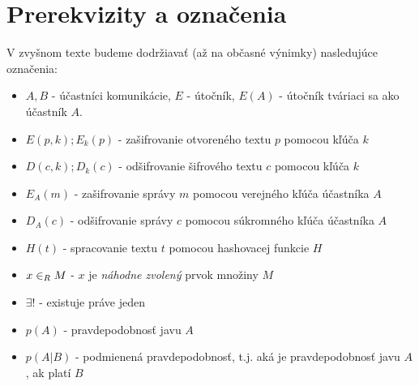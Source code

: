 \section{Prerekvizity a označenia}


V zvyšnom texte budeme dodržiavať (až na občasné výnimky) nasledujúce
označenia:
\begin{itemize}
\item $A,B$ - účastníci komunikácie, $E$ - útočník, $E(A)$ - útočník
            tváriaci sa ako účastník $A$.
\item $E(p,k); E_k(p)$ - zašifrovanie otvoreného textu $p$ pomocou kľúča $k$
\item $D(c,k); D_k(c)$ - odšifrovanie šifrového textu $c$ pomocou kľúča $k$
\item $E_A(m)$ - zašifrovanie správy $m$ pomocou verejného kľúča účastníka $A$
\item $D_A(c)$ - odšifrovanie správy $c$ pomocou súkromného kľúča účastníka $A$
\item $H(t)$ - spracovanie textu $t$ pomocou hashovacej funkcie $H$
\item $x \in_{R} M$ - $x$ je \emph{náhodne zvolený} prvok množiny $M$
\item $\exists !$ - existuje práve jeden
\item $p(A)$ - pravdepodobnosť javu $A$
\item $p(A|B)$ - podmienená pravdepodobnosť, t.j. aká je pravdepodobnosť javu $A$, ak platí $B$
\end{itemize}
